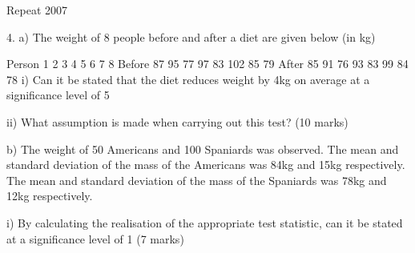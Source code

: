 Repeat 2007
 
4. a) The weight of 8 people before and after a diet are given below (in kg)
 
Person
1
2
3
4
5
6
7
8
Before
87
95
77
97
83
102
85
79
After
85
91
76
93
83
99
84
78
i) Can it be stated that the diet reduces weight by 4kg on average at a significance level of 5%
 
ii) What assumption is made when carrying out this test?
(10 marks)
 
b) The weight of 50 Americans and 100 Spaniards was observed. The mean and standard deviation of the mass of the Americans was 84kg and 15kg respectively. The mean and standard deviation of the mass of the Spaniards was 78kg and 12kg respectively.
 
i)                  By calculating the realisation of the appropriate test statistic, can it be stated at a significance level of 1%
(7 marks)